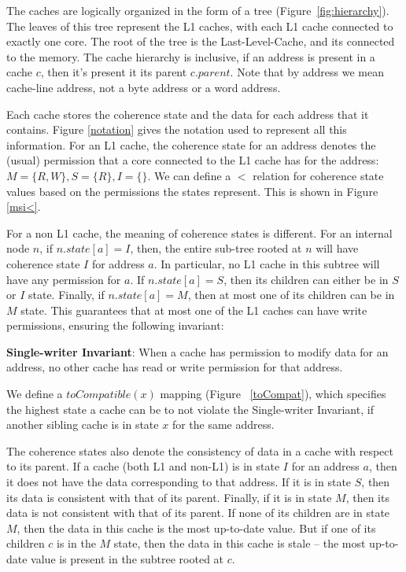 The caches are logically organized in the form of a tree
(Figure~\ref{fig:hierarchy}). The leaves of this tree represent the L1 caches,
with each L1 cache connected to exactly one core. The root of the tree is the
Last-Level-Cache, and its connected to the memory. The cache hierarchy is
inclusive, \ie if an address is present in a cache $c$, then it's present it its
parent $c.parent$. Note that by address we mean cache-line address, not a byte
address or a word address.

Each cache stores the coherence state and the data for each address that it
contains.
Figure \ref{notation} gives the notation used to represent all this
information. For an L1 cache, the coherence state for an address denotes the
(usual) permission that a core connected to the L1 cache has for the address: $M
= \{R, W\}, S = \{R\}, I = \{\}$. We can define a $<$ relation for coherence
state values based on the permissions the states represent. This is shown in
Figure \ref{msi<}.

For a non L1 cache, the meaning of coherence states is different. For an
internal node $n$, if $n.state[a] = I$, then, the entire sub-tree rooted at $n$
will have coherence state $I$ for address $a$. In particular, no L1 cache in
this subtree will have any permission for $a$. If $n.state[a] = S$, then its
children can either be in $S$ or $I$ state. Finally, if $n.state[a] = M$, then
at most one of its children can be in $M$ state. This guarantees that at most
one of the L1 caches can have write permissions, ensuring the following
invariant:

\begin{inv}
\textbf{Single-writer Invariant}: When a cache has permission to modify data for
an address, no other cache has read or write permission for that
address.
\label{singleWriter}
\end{inv}

We define a $toCompatible(x)$ mapping (Figure ~\ref{toCompat}), which specifies
the highest state a cache can be to not violate the Single-writer Invariant, if
another sibling cache is in state $x$ for the same address.

The coherence states also denote the consistency of data in a cache with respect
to its parent. If a cache (both L1 and non-L1) is in state $I$ for an address $a$,
then it does not have the data corresponding to that address. If it is in state
$S$, then its data is consistent with that of its parent. Finally, if it is in
state $M$, then its data is not consistent with that of its parent. If none of
its children are in state $M$, then the data in this cache is the most
up-to-date value. But if one of its children $c$ is in the $M$ state, then the
data in this cache is stale -- the most up-to-date value is present in the
subtree rooted at $c$.

